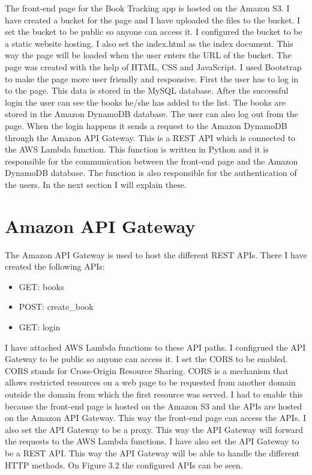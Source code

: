 \documentclass[11pt,a4paper,oneside]{report}
\begin{document}
The front-end page for the Book Tracking app is hosted on the Amazon S3. I have created a bucket for the page and I have uploaded the files to the bucket. I set the bucket to be public so anyone can access it. I configured the bucket to be a static website hosting. I also set the index.html as the index document. This way the page will be loaded when the user enters the URL of the bucket.
The page was created with the help of HTML, CSS and JavaScript. I used Bootstrap to make the page more user friendly and responsive. First the user has to log in to the page.
This data is stored in the MySQL database. After the successful login the user can see the books he/she has added to the list.
The books are stored in the Amazon DynamoDB database. The user can also log out from the page.
When the login happens it sends a request to the Amazon DynamoDB through the Amazon API Gateway.
This is a REST API which is connected to the AWS Lambda function. This function is written in Python and it is responsible for the communication between the front-end page and the Amazon DynamoDB database.
The function is also responsible for the authentication of the users.
In the next section I will explain these.

\section{Amazon API Gateway}

The Amazon API Gateway is used to host the different REST APIs. There I have created the following APIs:
\begin{itemize}
  \item GET: books
  \item POST: create\_book
  \item GET: login
\end{itemize}

I have attached AWS Lambda functions to these API paths. I configrued the API Gateway to be public so anyone can access it.
I set the CORS to be enabled. CORS stands for Cross-Origin Resource Sharing. CORS is a mechanism that allows restricted resources on a web page to be requested from another domain outside the domain from which the first resource was served.
I had to enable this because the front-end page is hosted on the Amazon S3 and the APIs are hosted on the Amazon API Gateway.
This way the front-end page can access the APIs. I also set the API Gateway to be a proxy. This way the API Gateway will forward the requests to the AWS Lambda functions. I have also set the API Gateway to be a REST API. This way the API Gateway will be able to handle the different HTTP methods.
On Figure 3.2 the configured APIs can be seen.
\end{document}
